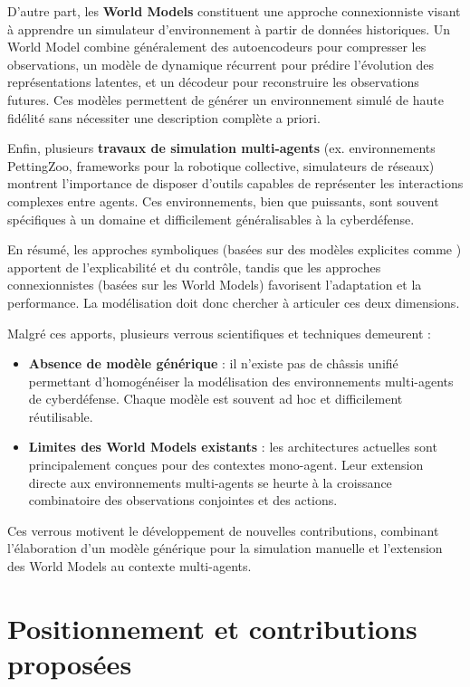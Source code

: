 D’autre part, les \textbf{World Models} constituent une approche connexionniste visant à apprendre un simulateur d’environnement à partir de données historiques.
Un World Model combine généralement des autoencodeurs pour compresser les observations, un modèle de dynamique récurrent pour prédire l’évolution des représentations latentes, et un décodeur pour reconstruire les observations futures.
Ces modèles permettent de générer un environnement simulé de haute fidélité sans nécessiter une description complète a priori.

Enfin, plusieurs \textbf{travaux de simulation multi-agents} (ex. environnements PettingZoo, frameworks pour la robotique collective, simulateurs de réseaux) montrent l’importance de disposer d’outils capables de représenter les interactions complexes entre agents.
Ces environnements, bien que puissants, sont souvent spécifiques à un domaine et difficilement généralisables à la cyberdéfense.

En résumé, les approches symboliques (basées sur des modèles explicites comme ) apportent de l’explicabilité et du contrôle, tandis que les approches connexionnistes (basées sur les World Models) favorisent l’adaptation et la performance.
La modélisation doit donc chercher à articuler ces deux dimensions.

Malgré ces apports, plusieurs verrous scientifiques et techniques demeurent :
\begin{itemize}
    \item \textbf{Absence de modèle générique} : il n’existe pas de châssis unifié permettant d’homogénéiser la modélisation des environnements multi-agents de cyberdéfense. Chaque modèle est souvent ad hoc et difficilement réutilisable.
    \item \textbf{Limites des World Models existants} : les architectures actuelles sont principalement conçues pour des contextes mono-agent. Leur extension directe aux environnements multi-agents se heurte à la croissance combinatoire des observations conjointes et des actions.
\end{itemize}

Ces verrous motivent le développement de nouvelles contributions, combinant l’élaboration d’un modèle générique pour la simulation manuelle et l’extension des World Models au contexte multi-agents.

\section{Positionnement et contributions proposées}

